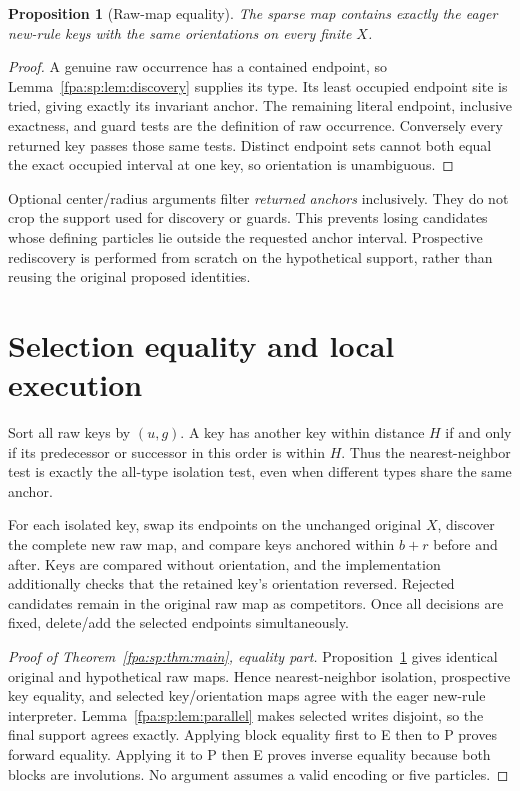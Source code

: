 \documentclass[11pt,a4paper]{article}
\numberwithin{equation}{section}
\newtheorem{proposition}[theorem]{Proposition}
\begin{document}
\begin{proposition}[Raw-map equality]\label{fpa:sp:prop:raw}
The sparse map contains exactly the eager new-rule keys with the same orientations on every finite $X$.
\end{proposition}
\begin{proof}
A genuine raw occurrence has a contained endpoint, so Lemma~\ref{fpa:sp:lem:discovery} supplies its type. Its least occupied endpoint site is tried, giving exactly its invariant anchor. The remaining literal endpoint, inclusive exactness, and guard tests are the definition of raw occurrence. Conversely every returned key passes those same tests. Distinct endpoint sets cannot both equal the exact occupied interval at one key, so orientation is unambiguous.
\end{proof}
Optional center/radius arguments filter \emph{returned anchors} inclusively. They do not crop the support used for discovery or guards. This prevents losing candidates whose defining particles lie outside the requested anchor interval. Prospective rediscovery is performed from scratch on the hypothetical support, rather than reusing the original proposed identities.

\section{Selection equality and local execution}
Sort all raw keys by $(u,g)$. A key has another key within distance $H$ if and only if its predecessor or successor in this order is within $H$. Thus the nearest-neighbor test is exactly the all-type isolation test, even when different types share the same anchor.

For each isolated key, swap its endpoints on the unchanged original $X$, discover the complete new raw map, and compare keys anchored within $b+r$ before and after. Keys are compared without orientation, and the implementation additionally checks that the retained key's orientation reversed. Rejected candidates remain in the original raw map as competitors. Once all decisions are fixed, delete/add the selected endpoints simultaneously.

\begin{proof}[Proof of Theorem~\ref{fpa:sp:thm:main}, equality part]
Proposition~\ref{fpa:sp:prop:raw} gives identical original and hypothetical raw maps. Hence nearest-neighbor isolation, prospective key equality, and selected key/orientation maps agree with the eager new-rule interpreter. Lemma~\ref{fpa:sp:lem:parallel} makes selected writes disjoint, so the final support agrees exactly. Applying block equality first to E then to P proves forward equality. Applying it to P then E proves inverse equality because both blocks are involutions. No argument assumes a valid encoding or five particles.
\end{proof}
\end{document}
